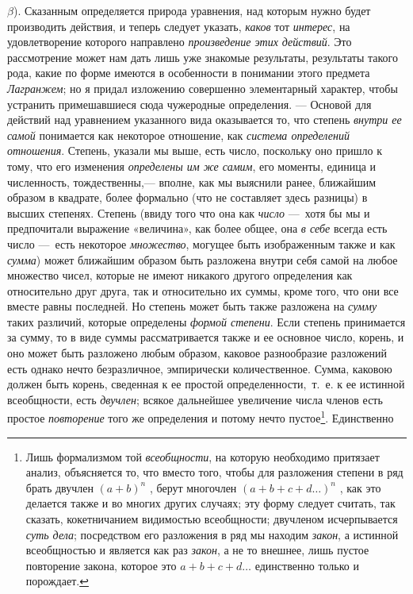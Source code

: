 $\beta $). Сказанным определяется природа уравнения, над которым нужно будет
производить действия, и теперь следует указать,
{\em каков} тот {\em интерес}, на
удовлетворение которого направлено {\em произведение
этих действий}. Это рассмотрение может нам дать лишь уже знакомые
результаты, результаты такого рода, какие по форме имеются в особенности в
понимании этого предмета {\em Лагранжем}; но я придал
изложению совершенно элементарный характер, чтобы устранить примешавшиеся
сюда чужеродные определения. — Основой для действий над уравнением
указанного вида оказывается то, что степень {\em внутри
ее самой} понимается как некоторое отношение, как
{\em система определений отношения}. Степень, указали
мы выше, есть число, поскольку оно пришло к тому, что его изменения
{\em определены им же самим}, его моменты, единица и
численность, тождественны,— вполне, как мы выяснили ранее, ближайшим
образом в квадрате, более формально (что не составляет здесь разницы) в
высших степенях. Степень (ввиду того что она как
{\em число} —~хотя бы мы и предпочитали выражение
«величина», как более общее, она {\em в себе} всегда
есть число —~есть некоторое {\em множество}, могущее
быть изображенным также и как {\em сумма}) может
ближайшим образом быть разложена внутри себя самой на любое множество
чисел, которые не имеют никакого другого определения как относительно друг
друга, так и относительно их суммы, кроме того, что они все вместе равны
последней. Но степень может быть также разложена на
{\em сумму} таких различий, которые определены
{\em формой степени}. Если степень принимается за
сумму, то в виде суммы рассматривается также и ее основное число, корень, и
оно может быть разложено любым образом, каковое разнообразие разложений
есть однако нечто безразличное, эмпирически количественное. Сумма, каковою
должен быть корень, сведенная к ее простой определенности,~т.~е. к ее
истинной всеобщности, есть {\em двучлен}; всякое
дальнейшее увеличение числа членов есть простое
{\em повторение} того же определения и потому нечто
пустое\footnote{Лишь формализмом той {\em всеобщности}, на
которую необходимо притязает анализ, объясняется то, что вместо того, чтобы
для разложения степени в ряд брать двучлен  $ (a + b)^n $ ,
берут многочлен $ (a + b + c + d \dots)^n $ , как
это делается также и во многих других случаях; эту форму следует считать,
так сказать, кокетничанием видимостью всеобщности; двучленом исчерпывается
{\em суть дела}; посредством его разложения в ряд мы находим
{\em закон}, а истинной всеобщностью и является как раз
{\em закон}, а не то внешнее, лишь пустое повторение закона, которое это
$ a + b + c + d \dots $ единственно только и порождает.}. Единственно
